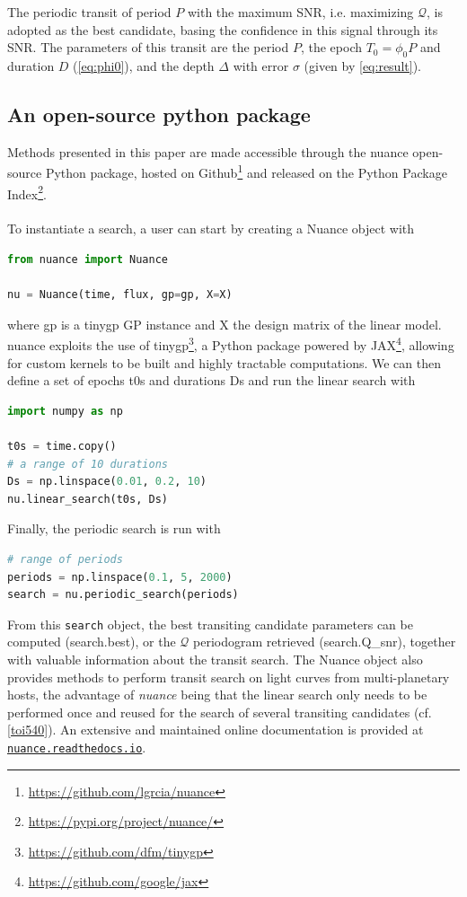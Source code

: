 \documentclass[modern]{aastex631}
\newcommand{\nuancemethod}{\textit{nuance}}
\newcommand{\nuancecode}{\textsf{nuance}}
\newcommand{\footlink}[1]{\footnote{\url{#1}}}
\begin{document}
The periodic transit of period $P$ with the maximum SNR, i.e. maximizing $\mathcal{Q}$, is adopted as the best candidate, basing the confidence in this signal through its SNR. The parameters of this transit are the period $P$, the epoch $T_0 = \phi_0 P$ and duration $D$ (\autoref{eq:phi0}), and the depth $\Delta$ with error $\sigma$ (given by \autoref{eq:result}).

\subsection{An open-source python package}\label{package}
Methods presented in this paper are made accessible through the \nuancecode{} open-source Python package, hosted on Github\footnote{\href{https://github.com/lgrcia/nuance}{https://github.com/lgrcia/nuance}} and released on the Python Package Index\footlink{https://pypi.org/project/nuance/}. 
\\\\
To instantiate a search, a user can start by creating a \textsf{Nuance} object with
\begin{lstlisting}[language=Python]
from nuance import Nuance

nu = Nuance(time, flux, gp=gp, X=X)
\end{lstlisting}
where \textsf{gp} is a \textsf{tinygp} GP instance and \textsf{X} the design matrix of the linear model. \textsf{nuance} exploits the use of \textsf{tinygp}\footnote{\href{https://github.com/dfm/tinygp}{https://github.com/dfm/tinygp}}, a Python package powered by \textsf{JAX}\footnote{\href{https://github.com/google/jax}{https://github.com/google/jax}}, allowing for custom kernels to be built and highly tractable computations. We can then define a set of epochs \textsf{t0s} and durations \textsf{Ds} and run the linear search with
\begin{lstlisting}[language=Python,linewidth=\linewidth]
import numpy as np

t0s = time.copy()
# a range of 10 durations
Ds = np.linspace(0.01, 0.2, 10)
nu.linear_search(t0s, Ds)
\end{lstlisting}
Finally, the periodic search is run with
\begin{lstlisting}[language=Python]
# range of periods
periods = np.linspace(0.1, 5, 2000)
search = nu.periodic_search(periods)
\end{lstlisting}
From this \texttt{search} object, the best transiting candidate parameters can be computed (\textsf{search.best}), or the $\mathcal{Q}$ periodogram retrieved (\textsf{search.Q\_snr}), together with valuable information about the transit search. The \textsf{Nuance} object also provides methods to perform transit search on light curves from multi-planetary hosts, the advantage of \nuancemethod{} being that the linear search only needs to be performed once and reused for the search of several transiting candidates (cf.\;\autoref{toi540}). An extensive and maintained online documentation is provided at \href{https://nuance.readthedocs.io}{\texttt{nuance.readthedocs.io}}.
\end{document}
